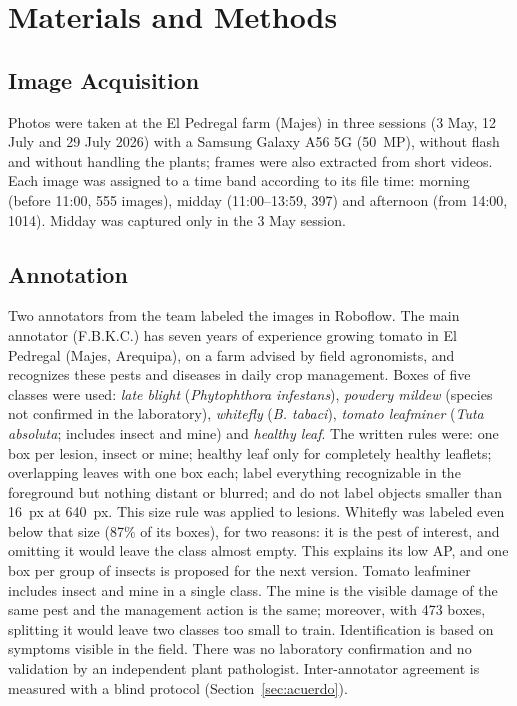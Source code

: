\documentclass[sensors,article,submit,pdftex,moreauthors]{Definitions/mdpi}
\begin{document}
\section{Materials and Methods}

\subsection{Image Acquisition}

Photos were taken at the El Pedregal farm (Majes) in three sessions (3 May, 12 July and 29 July 2026) with a Samsung Galaxy A56 5G (50~MP), without flash and without handling the plants; frames were also extracted from short videos. Each image was assigned to a time band according to its file time: morning (before 11:00, 555 images), midday (11:00--13:59, 397) and afternoon (from 14:00, 1014). Midday was captured only in the 3 May session.

\subsection{Annotation}\label{sec:anotacion}

Two annotators from the team labeled the images in Roboflow. The main annotator (F.B.K.C.) has seven years of experience growing tomato in El Pedregal (Majes, Arequipa), on a farm advised by field agronomists, and recognizes these pests and diseases in daily crop management. Boxes of five classes were used: \emph{late blight} (\emph{Phytophthora infestans}), \emph{powdery mildew} (species not confirmed in the laboratory), \emph{whitefly} (\emph{B. tabaci}), \emph{tomato leafminer} (\emph{Tuta absoluta}; includes insect and mine) and \emph{healthy leaf}. The written rules were: one box per lesion, insect or mine; healthy leaf only for completely healthy leaflets; overlapping leaves with one box each; label everything recognizable in the foreground but nothing distant or blurred; and do not label objects smaller than 16~px at 640~px. This size rule was applied to lesions. Whitefly was labeled even below that size (87\% of its boxes), for two reasons: it is the pest of interest, and omitting it would leave the class almost empty. This explains its low AP, and one box per group of insects is proposed for the next version. Tomato leafminer includes insect and mine in a single class. The mine is the visible damage of the same pest and the management action is the same; moreover, with 473 boxes, splitting it would leave two classes too small to train. Identification is based on symptoms visible in the field. There was no laboratory confirmation and no validation by an independent plant pathologist. Inter-annotator agreement is measured with a blind protocol (Section~\ref{sec:acuerdo}).
\end{document}
